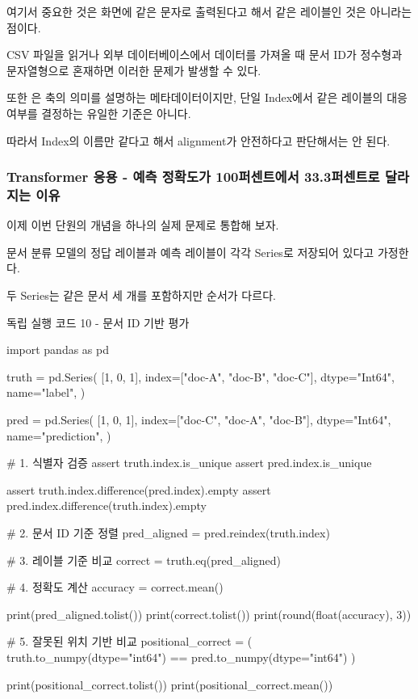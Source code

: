 \begin{dhkzsh}
\end{dhkzsh}

여기서 중요한 것은 화면에 같은 문자로 출력된다고 해서 같은 레이블인 것은 아니라는 점이다.

CSV 파일을 읽거나 외부 데이터베이스에서 데이터를 가져올 때 문서 ID가 정수형과 문자열형으로 혼재하면 이러한 문제가 발생할 수 있다.

또한 은 축의 의미를 설명하는 메타데이터이지만, 단일 Index에서 같은 레이블의 대응 여부를 결정하는 유일한 기준은 아니다.

따라서 Index의 이름만 같다고 해서 alignment가 안전하다고 판단해서는 안 된다.

\subsubsection{Transformer 응용 - 예측 정확도가 100퍼센트에서 33.3퍼센트로 달라지는 이유}

이제 이번 단원의 개념을 하나의 실제 문제로 통합해 보자.

문서 분류 모델의 정답 레이블과 예측 레이블이 각각 Series로 저장되어 있다고 가정한다.

두 Series는 같은 문서 세 개를 포함하지만 순서가 다르다.

\begin{dhknote}
\begin{dhksmry}[centered]
독립 실행 코드 10 - 문서 ID 기반 평가
\end{dhksmry}
\end{dhknote}

\begin{dhkcode}
import pandas as pd

truth = pd.Series(
    [1, 0, 1],
    index=["doc-A", "doc-B", "doc-C"],
    dtype="Int64",
    name="label",
)

pred = pd.Series(
    [1, 0, 1],
    index=["doc-C", "doc-A", "doc-B"],
    dtype="Int64",
    name="prediction",
)

# 1. 식별자 검증
assert truth.index.is_unique
assert pred.index.is_unique

assert truth.index.difference(pred.index).empty
assert pred.index.difference(truth.index).empty

# 2. 문서 ID 기준 정렬
pred_aligned = pred.reindex(truth.index)

# 3. 레이블 기준 비교
correct = truth.eq(pred_aligned)

# 4. 정확도 계산
accuracy = correct.mean()

print(pred_aligned.tolist())
print(correct.tolist())
print(round(float(accuracy), 3))

# 5. 잘못된 위치 기반 비교
positional_correct = (
    truth.to_numpy(dtype="int64")
    == pred.to_numpy(dtype="int64")
)

print(positional_correct.tolist())
print(positional_correct.mean())
\end{dhkcode}

